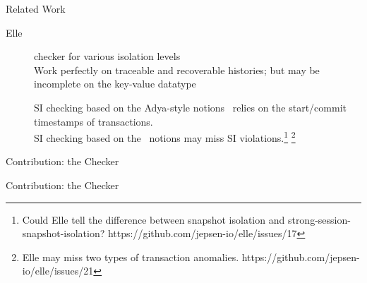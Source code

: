 \begin{frame}{Related Work}
  \begin{description}
    \item[Elle~] checker for various isolation levels \\[2pt]

      \vspace{0.20cm}
      Work perfectly on traceable and recoverable histories;
      but may be incomplete on the key-value datatype

      \pause
      \vspace{0.20cm}
      SI checking based on the Adya-style notions~
      relies on the start/commit timestamps of transactions.\\[2pt]

      \pause
      \vspace{0.20cm}
      SI checking based on the~ notions
      may miss SI violations.\footnote{
        Could Elle tell the difference between snapshot isolation and strong-session-snapshot-isolation? https://github.com/jepsen-io/elle/issues/17}
        \footnote{Elle may miss two types of transaction anomalies. https://github.com/jepsen-io/elle/issues/21}
  \end{description}
\end{frame}

\begin{frame}{Contribution: the \polysi{} Checker}
\end{frame}

\begin{frame}{Contribution: the \polysi{} Checker}
  \begin{center}
    

    \vspace{0.50cm}
  \end{center}
\end{frame}
